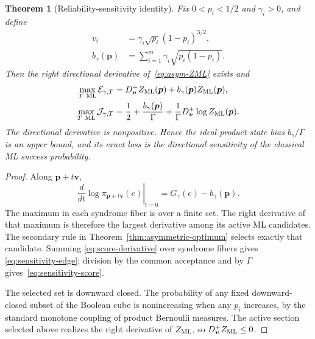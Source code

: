 \documentclass[journal]{IEEEtran}
\newtheorem{theorem}{Theorem}
\theoremstyle{definition}
\theoremstyle{remark}
\begin{document}
\begin{theorem}[Reliability-sensitivity identity]
\label{thm:reliability-sensitivity}
Fix $0<p_i<1/2$ and $\gamma_i>0$, and define
\begin{align}
 v_i&=\gamma_i\sqrt{p_i}(1-p_i)^{3/2},
 \label{eq:sensitivity-direction}\\
 b_\gamma(\boldsymbol p)
 &=\sum_{i=1}^m\gamma_i\sqrt{p_i(1-p_i)}.
 \label{eq:ideal-bias}
\end{align}
Then the right directional derivative of~\eqref{eq:asym-ZML} exists and
\begin{align}
 \max_{T\ {\rm ML}}\mathcal E_{\gamma,T}
 &=D_{\boldsymbol v}^{+}Z_{\rm ML}(\boldsymbol p)
   +b_\gamma(\boldsymbol p)Z_{\rm ML}(\boldsymbol p),
 \label{eq:sensitivity-edge}\\
 \max_{T\ {\rm ML}}\mathcal J_{\gamma,T}
 &=\frac12+\frac{b_\gamma(\boldsymbol p)}{\Gamma}
   +\frac1\Gamma D_{\boldsymbol v}^{+}
       \log Z_{\rm ML}(\boldsymbol p).
 \label{eq:sensitivity-score}
\end{align}
The directional derivative is nonpositive.  Hence the ideal product-state
bias $b_\gamma/\Gamma$ is an upper bound, and its exact loss is the
directional sensitivity of the classical ML success probability.
\end{theorem}

\begin{proof}
Along $\boldsymbol p+t\boldsymbol v$,
\begin{equation}
 \left.\frac{d}{dt}\log\pi_{\boldsymbol p+t\boldsymbol v}(e)
 \right|_{t=0}
 =G_\gamma(e)-b_\gamma(\boldsymbol p).
 \label{eq:score-derivative}
\end{equation}
The maximum in each syndrome fiber is over a finite set.  The right
derivative of that maximum is therefore the largest derivative among its
active ML candidates.  The secondary rule in
Theorem~\ref{thm:asymmetric-optimum} selects exactly that candidate.  Summing
\eqref{eq:score-derivative} over syndrome fibers gives
\eqref{eq:sensitivity-edge}; division by the common acceptance and by
$\Gamma$ gives~\eqref{eq:sensitivity-score}.

The selected set is downward closed.  The probability of any fixed downward-
closed subset of the Boolean cube is nonincreasing when any $p_i$ increases,
by the standard monotone coupling of product Bernoulli measures.  The active
section selected above realizes the right derivative of $Z_{\rm ML}$, so
$D_{\boldsymbol v}^{+}Z_{\rm ML}\le0$.
\end{proof}
\end{document}
